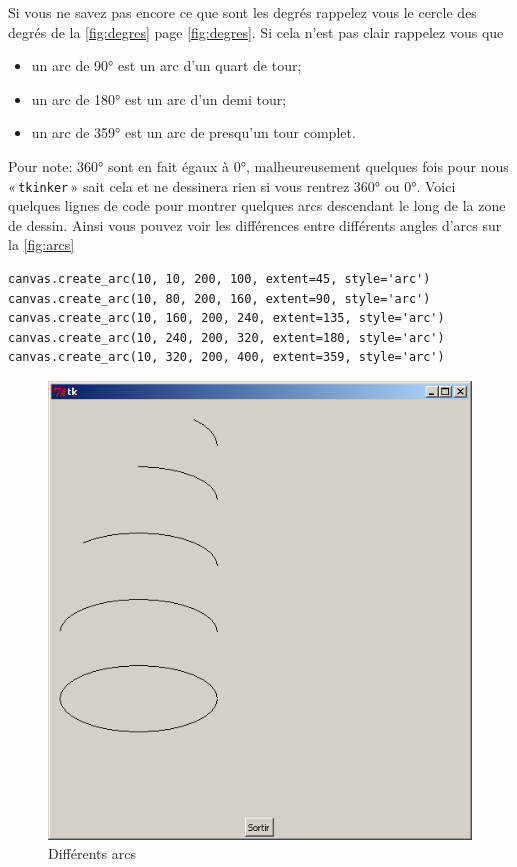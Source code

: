 Si vous ne savez pas encore ce que sont les degrés rappelez vous le cercle des degrés de la \autoref{fig:degres} page \autoref{fig:degres}. Si cela n'est pas clair rappelez vous que
\begin{itemize}
\item un arc de 90° est un arc d'un quart de tour;
\item un arc de 180° est un arc d'un demi tour;
\item un arc de 359° est un arc de presqu'un tour complet.
\end{itemize}

Pour note: 360° sont en fait égaux à 0°, malheureusement quelques fois pour nous « \texttt{tkinker} » sait cela et ne dessinera rien si vous rentrez 360° ou 0°. Voici quelques lignes de code pour montrer quelques arcs descendant le long de la zone de dessin. Ainsi vous pouvez voir les différences entre différents angles d'arcs sur la \autoref{fig:arcs}
\begin{Verbatim}[frame=single,rulecolor=\color{mbleu}, label=à taper]
canvas.create_arc(10, 10, 200, 100, extent=45, style='arc')
canvas.create_arc(10, 80, 200, 160, extent=90, style='arc')
canvas.create_arc(10, 160, 200, 240, extent=135, style='arc')
canvas.create_arc(10, 240, 200, 320, extent=180, style='arc')
canvas.create_arc(10, 320, 200, 400, extent=359, style='arc')
\end{Verbatim}

\begin{figure}[h!]
\centering
\includegraphics[scale=0.4]{images/arcs}
\caption{Différents arcs}\label{fig:arcs}
\end{figure}


